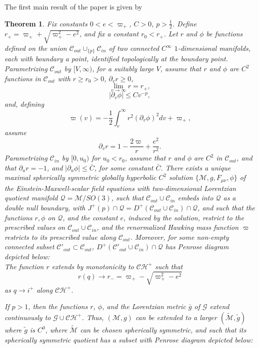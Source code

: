\documentclass{article}
\newtheorem{theorem}{Theorem}[section]
\begin{document}
The first main result of the paper is given by
\begin{theorem}
\label{eis9ew}
Fix constants $0<e<\varpi_+$, $C>0$, $p>\frac12$.
Define $r_+=\varpi_++\sqrt{\varpi_+^2-e^2}$, and fix a constant $r_0<r_+$.
Let $r$ and $\phi$ be functions defined on 
the union $\mathcal{C}_{out}\cup_{\{p\}}\mathcal{C}_{in}$
of two connected $C^\infty$
$1$-dimensional manifolds, each with boundary a point, 
identified topologically at the boundary point.
Parametrizing $\mathcal{C}_{out}$ by $[V,\infty)$, for a suitably large
$V$,
assume that $r$ and 
$\phi$ are $C^2$ functions in $\mathcal{C}_{out}$ 
with $r\ge r_0>0$, $\partial_vr\ge 0$,  
\[
\lim_{v\to\infty}r=r_+,
\] 
\begin{equation}
\label{avtitoumavva}
|\partial_v\phi|\le Cv^{-p},
\end{equation}
and, defining 
\[
\varpi(v)=-\frac12\int_{v}^\infty{r^2}(\partial_v\phi)^2dv+\varpi_+,
\]
assume
\[
\partial_vr=1-\frac{2\varpi}r+\frac{e^2}{r^2}.
\]
Parametrizing $\mathcal{C}_{in}$ by $[0,u_0)$ for $u_0<r_0$, assume that
$r$ and $\phi$ are $C^2$ in $\mathcal{C}_{out}$, and
that $\partial_ur=-1$, and
$|\partial_u\phi|\le\bar{C}$, for some
constant $\bar{C}$.
There exists a unique maximal
spherically symmetric globally hyperbolic
$C^2$ solution 
$\{\mathcal{M}, g, F_{\mu\nu}, \phi\}$ of the
Einstein-Maxwell-scalar field equations with two-dimensional
Lorentzian quotient manifold $\mathcal{Q}=\mathcal{M}/SO(3)$,
such that $\mathcal{C}_{out}\cup\mathcal{C}_{in}$ embeds into
$\mathcal{Q}$ as a double null boundary, with 
$J^+(p)\cap\mathcal{Q}=D^+(\mathcal{C}_{out}\cup\mathcal{C}_{in})\cap\mathcal{Q}$,
and such that the functions $r,\phi$ on $\mathcal{Q}$, and the constant $e$,
induced by the solution, restrict to
the prescribed values on $\mathcal{C}_{out}\cup\mathcal{C}_{in}$,
and the renormalized Hawking mass function $\varpi$ restricts to 
its prescribed value along $\mathcal{C}_{out}$.
Moreover, for some non-empty connected subset 
$\mathcal{C}'_{out}\subset\mathcal{C}_{out}$,
$D^+(\mathcal{C}'_{out}\cup\mathcal{C}_{in})\cap\mathcal{Q}$ has Penrose
diagram depicted below:
\[

\]
The function $r$ extends by monotonicity to $\mathcal{CH}^+$
such that 
\[
r(q)\to r_-=\varpi_+-\sqrt{\varpi_+^2-e^2}
\]
as $q\to i^+$ along
$\mathcal{CH}^+$.

If $p>1$, then  
the functions $r$, $\phi$, and the Lorentzian metric
$\bar{g}$ of $\mathcal{G}$ extend continuously to 
$\mathcal{G}\cup\mathcal{CH}^+$.
Thus,
$(\mathcal{M},g)$ can be extended to a larger
$(\tilde{\mathcal{M}},\tilde{g})$ where $\tilde{g}$ is $C^0$,
where $\tilde{\mathcal{M}}$ can be chosen spherically symmetric,
and such that its spherically symmetric quotient has a subset
with Penrose diagram depicted below:
\[

\]
\end{theorem}
\end{document}
